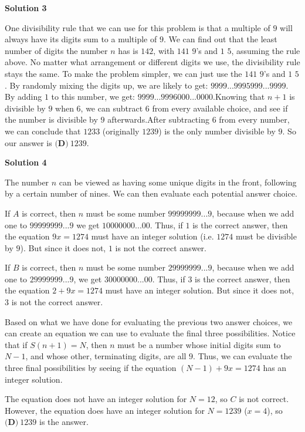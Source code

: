 \begin{enumerate}
 



\textbf{Solution 3}

One divisibility rule that we can use for this problem is that a multiple of $9$ will always have its digits sum to a multiple of $9$. We can find out that the least number of digits the number $n$ has is $142$, with $141$ $9$'s and $1$ $5$, assuming the rule above. No matter what arrangement or different digits we use, the divisibility rule stays the same. To make the problem simpler, we can just use the $141$ $9$'s and $1$ $5$. By randomly mixing the digits up, we are likely to get: $9999$...$9995999$...$9999$. By adding $1$ to this number, we get: $9999$...$9996000$...$0000$.Knowing that $n+1$ is divisible by $9$ when $6$, we can subtract $6$ from every available choice, and see if the number is divisible by $9$ afterwards.After subtracting $6$ from every number, we can conclude that $1233$ (originally $1239$) is the only number divisible by $9$. So our answer is $\boxed{\textbf{(D)}\ 1239}$.

 



\textbf{Solution 4}

The number $n$ can be viewed as having some unique digits in the front, following by a certain number of nines. We can then evaluate each potential answer choice.

 If $A$ is correct, then $n$ must be some number $99999999...9$, because when we add one to $99999999...9$ we get $10000000...00$. Thus, if $1$ is the correct answer, then the equation $9x=1274$ must have an integer solution (i.e. $1274$ must be divisible by $9$). But since it does not, $1$ is not the correct answer.

 If $B$ is correct, then $n$ must be some number $29999999...9$, because when we add one to $29999999...9$, we get $30000000...00$. Thus, if $3$ is the correct answer, then the equation $2+9x=1274$ must have an integer solution. But since it does not, $3$ is not the correct answer.

 Based on what we have done for evaluating the previous two answer choices, we can create an equation we can use to evaluate the final three possibilities. Notice that if $S(n+1)=N$, then $n$ must be a number whose initial digits sum to $N-1$, and whose other, terminating digits, are all $9$. Thus, we can evaluate the three final possibilities by seeing if the equation $(N-1)+9x=1274$ has an integer solution.

 The equation does not have an integer solution for $N=12$, so $C$ is not correct. However, the equation does have an integer solution for $N=1239$ ($x=4$), so $\boxed{\textbf{(D)} ~1239}$ is the answer.


\end{enumerate}
